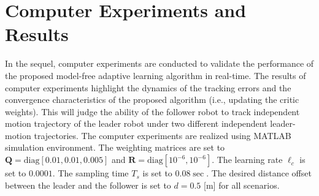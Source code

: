 \documentclass[conference]{IEEEtran}
\begin{document}
    


  

\section{Computer Experiments and Results}
\label{sec:resultsExperiments}
In the sequel, computer experiments  are conducted to validate the performance of the proposed model-free adaptive learning algorithm in real-time. The results of computer experiments highlight the dynamics of the tracking errors and the convergence characteristics of the proposed algorithm (i.e., updating the critic weights). This will judge the ability of the follower robot to track independent motion trajectory of the leader robot under two different independent leader-motion trajectories. The computer experiments are realized using MATLAB simulation environment. The weighting matrices are set to $\mathbf{Q} = \mathrm{diag}[0.01,0.01,0.005]$ and $\mathbf{R} = \mathrm{diag}[10^{-6}, 10^{-6}].$ %
The learning rate $\ell_c$ is set to  $0.0001$. The sampling time $T_s$ is set to $0.08 \sec.$ The desired distance offset between the leader and the follower is set to $ d = 0.5$ [m] for all scenarios.
\end{document}
